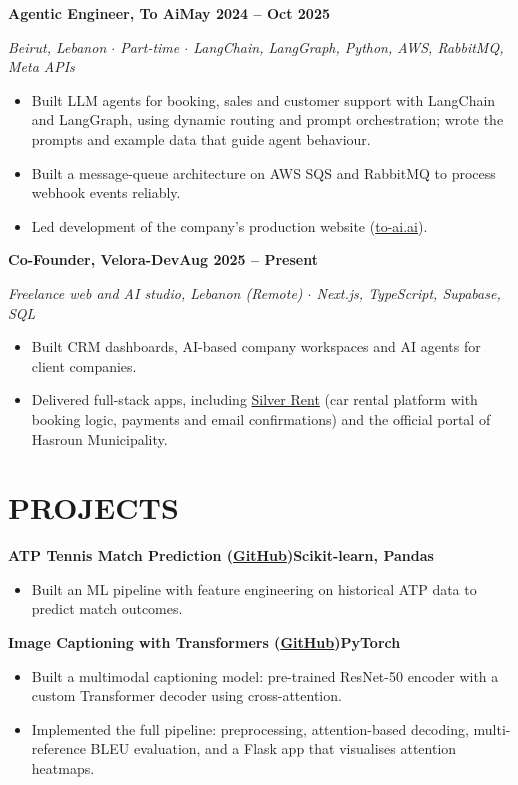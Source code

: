 \documentclass[10pt, a4paper]{article}
\newcommand{\entry}[2]{\vspace{5pt}\textbf{#1}\hfill\textbf{#2}\par}
\newcommand{\sub}[1]{\textit{#1}\par}
\begin{document}
\entry{Agentic Engineer, To Ai}{May 2024 -- Oct 2025}
\sub{Beirut, Lebanon $\cdot$ Part-time $\cdot$ LangChain, LangGraph, Python, AWS, RabbitMQ, Meta APIs}
\begin{itemize}
    \item Built LLM agents for booking, sales and customer support with LangChain and LangGraph, using dynamic routing and prompt orchestration; wrote the prompts and example data that guide agent behaviour.
    \item Built a message-queue architecture on AWS SQS and RabbitMQ to process webhook events reliably.
    \item Led development of the company's production website (\href{https://to-ai.ai}{to-ai.ai}).
\end{itemize}

\entry{Co-Founder, Velora-Dev}{Aug 2025 -- Present}
\sub{Freelance web and AI studio, Lebanon (Remote) $\cdot$ Next.js, TypeScript, Supabase, SQL}
\begin{itemize}
    \item Built CRM dashboards, AI-based company workspaces and AI agents for client companies.
    \item Delivered full-stack apps, including \href{https://www.silver-rent.be}{Silver Rent} (car rental platform with booking logic, payments and email confirmations) and the official portal of Hasroun Municipality.
\end{itemize}

\section*{PROJECTS}
\entry{ATP Tennis Match Prediction (\href{https://github.com/Farrous05/atp-tennis-ml}{GitHub})}{Scikit-learn, Pandas}
\begin{itemize}
    \item Built an ML pipeline with feature engineering on historical ATP data to predict match outcomes.
\end{itemize}

\entry{Image Captioning with Transformers (\href{https://github.com/Farrous05/image-caption-transformer}{GitHub})}{PyTorch}
\begin{itemize}
    \item Built a multimodal captioning model: pre-trained ResNet-50 encoder with a custom Transformer decoder using cross-attention.
    \item Implemented the full pipeline: preprocessing, attention-based decoding, multi-reference BLEU evaluation, and a Flask app that visualises attention heatmaps.
\end{itemize}
\end{document}
